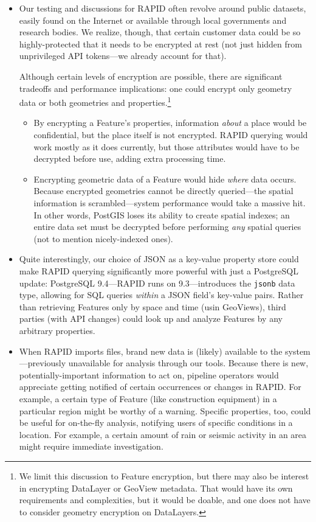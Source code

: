 \begin{itemize}
    \item Our testing and discussions for RAPID often revolve around public datasets, easily found on the Internet or available through local governments and research bodies. We realize, though, that certain customer data could be so highly-protected that it needs to be encrypted at rest (not just hidden from unprivileged API tokens---we already account for that).
    
    Although certain levels of encryption are possible, there are significant tradeoffs and performance implications: one could encrypt only geometry data or both geometries and properties.\footnote{We limit this discussion to Feature encryption, but there may also be interest in encrypting DataLayer or GeoView metadata. That would have its own requirements and complexities, but it would be doable, and one does not have to consider geometry encryption on DataLayers.}
    \begin{itemize}
        \item By encrypting a Feature's properties, information \textit{about} a place would be confidential, but the place itself is not encrypted. RAPID querying would work mostly as it does currently, but those attributes would have to be decrypted before use, adding extra processing time.
        \item Encrypting geometric data of a Feature would hide \textit{where} data occurs. Because encrypted geometries cannot be directly queried---the spatial information is scrambled---system performance would take a massive hit. In other words, PostGIS loses its ability to create spatial indexes; an entire data set must be decrypted before performing \textit{any} spatial queries (not to mention nicely-indexed ones).
    \end{itemize}
    
    \item Quite interestingly, our choice of JSON as a key-value property store could make RAPID querying significantly more powerful with just a PostgreSQL update: PostgreSQL 9.4---RAPID runs on 9.3---introduces the \texttt{jsonb} data type, allowing for SQL queries \textit{within} a JSON field's key-value pairs. Rather than retrieving Features only by space and time (usin GeoViews), third parties (with API changes) could look up and analyze Features by any arbitrary properties.
    
    \item When RAPID imports files, brand new data is (likely) available to the system---previously unavailable for analysis through our tools. Because there is new, potentially-important information to act on, pipeline operators would appreciate getting notified of certain occurrences or changes in RAPID. For example, a certain type of Feature (like construction equipment) in a particular region might be worthy of a warning. Specific properties, too, could be useful for on-the-fly analysis, notifying users of specific conditions in a location. For example, a certain amount of rain or seismic activity in an area might require immediate investigation.
    

\end{itemize}
